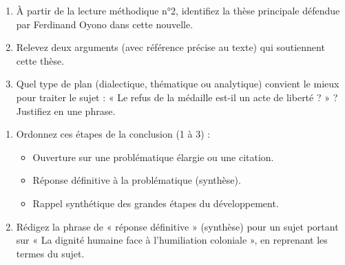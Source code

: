 \documentclass[11pt]{article}
\begin{document}
\begin{exercice}
\begin{enumerate}
    \item À partir de la lecture méthodique n°2, identifiez la thèse principale défendue par Ferdinand Oyono dans cette nouvelle.
    \item Relevez deux arguments (avec référence précise au texte) qui soutiennent cette thèse.
    \item Quel type de plan (dialectique, thématique ou analytique) convient le mieux pour traiter le sujet : « Le refus de la médaille est-il un acte de liberté ? » ? Justifiez en une phrase.
\end{enumerate}
\end{exercice}

\begin{exercice}
\begin{enumerate}
    \item Ordonnez ces étapes de la conclusion (1 à 3) :
    \begin{itemize}
        \item[•] \underline{\hspace{0,5cm}} Ouverture sur une problématique élargie ou une citation.
        \item[•] \underline{\hspace{0,5cm}} Réponse définitive à la problématique (synthèse).
        \item[•] \underline{\hspace{0,5cm}} Rappel synthétique des grandes étapes du développement.
    \end{itemize}
    \item Rédigez la phrase de « réponse définitive » (synthèse) pour un sujet portant sur « La dignité humaine face à l'humiliation coloniale », en reprenant les termes du sujet.
\end{enumerate}
\end{exercice}
\end{document}
